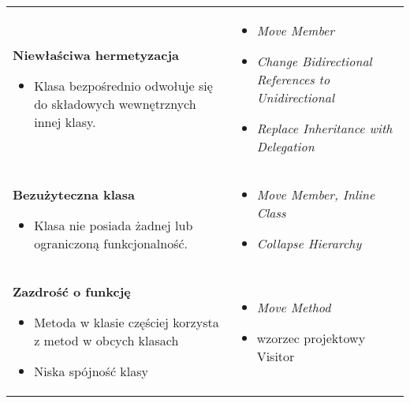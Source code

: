 \documentclass[../main.tex]{subfiles}
\begin{document}
\begin{table}[H]
\begin{center}
\begin{tabular}{ p{.35\linewidth} p{.65\linewidth}}
                \cmidrule(r){1-1}\cmidrule(l){2-2}
                \textbf{Niewłaściwa hermetyzacja}
                \begin{itemize}
                    \item Klasa bezpośrednio odwołuje się do składowych wewnętrznych innej klasy.
                \end{itemize}
                &
                \begin{itemize}
                    \item \textit{Move Member}
                    \item \textit{Change Bidirectional References to Unidirectional}
                    \item \textit{Replace Inheritance with Delegation}
                \end{itemize}
                \\

                \cmidrule(r){1-1}\cmidrule(l){2-2}
                \textbf{Bezużyteczna klasa}
                \begin{itemize}
                    \item Klasa nie posiada żadnej lub ograniczoną funkcjonalność.
                \end{itemize}
                &
                \begin{itemize}
                    \item \textit{Move Member, Inline Class}
                    \item \textit{Collapse Hierarchy}
                \end{itemize}
                \\

                \cmidrule(r){1-1}\cmidrule(l){2-2}
                \textbf{Zazdrość o funkcję}
                \begin{itemize}
                    \item Metoda w klasie częściej korzysta z metod w obcych klasach
                    \item Niska spójność klasy
                \end{itemize}
                &
                \begin{itemize}
                    \item \textit{Move Method}
                    \item wzorzec projektowy Visitor
                \end{itemize}
                \\


\end{tabular}
\end{center}
\end{table}
\end{document}
